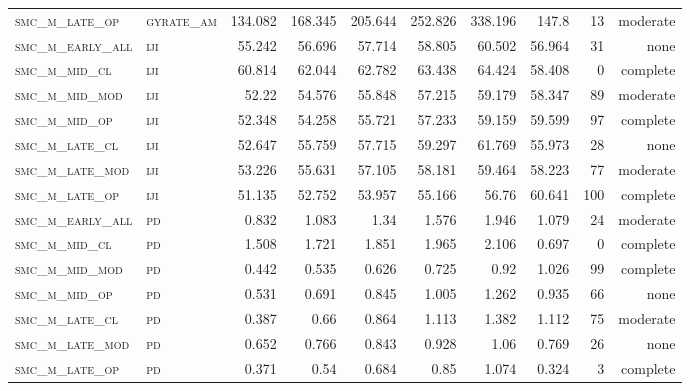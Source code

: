 \begin{landscape}
\begin{center}
\begin{footnotesize}
\begin{longtable}{llrrrrr|rrr}
\textsc{smc\_m\_late\_op  } & \textsc{gyrate\_am}   & 134.082  & 168.345  & 205.644  & 252.826  & 338.196  & 147.8    & 13  & moderate \\
\textsc{smc\_m\_early\_all} & \textsc{iji       }   & 55.242   & 56.696   & 57.714   & 58.805   & 60.502   & 56.964   & 31  & none     \\
\textsc{smc\_m\_mid\_cl   } & \textsc{iji       }   & 60.814   & 62.044   & 62.782   & 63.438   & 64.424   & 58.408   & 0   & complete \\
\textsc{smc\_m\_mid\_mod  } & \textsc{iji       }   & 52.22    & 54.576   & 55.848   & 57.215   & 59.179   & 58.347   & 89  & moderate \\
\textsc{smc\_m\_mid\_op   } & \textsc{iji       }   & 52.348   & 54.258   & 55.721   & 57.233   & 59.159   & 59.599   & 97  & complete \\
\textsc{smc\_m\_late\_cl  } & \textsc{iji       }   & 52.647   & 55.759   & 57.715   & 59.297   & 61.769   & 55.973   & 28  & none     \\
\textsc{smc\_m\_late\_mod } & \textsc{iji       }   & 53.226   & 55.631   & 57.105   & 58.181   & 59.464   & 58.223   & 77  & moderate \\
\textsc{smc\_m\_late\_op  } & \textsc{iji       }   & 51.135   & 52.752   & 53.957   & 55.166   & 56.76    & 60.641   & 100 & complete \\
\textsc{smc\_m\_early\_all} & \textsc{pd        }   & 0.832    & 1.083    & 1.34     & 1.576    & 1.946    & 1.079    & 24  & moderate \\
\textsc{smc\_m\_mid\_cl   } & \textsc{pd        }   & 1.508    & 1.721    & 1.851    & 1.965    & 2.106    & 0.697    & 0   & complete \\
\textsc{smc\_m\_mid\_mod  } & \textsc{pd        }   & 0.442    & 0.535    & 0.626    & 0.725    & 0.92     & 1.026    & 99  & complete \\
\textsc{smc\_m\_mid\_op   } & \textsc{pd        }   & 0.531    & 0.691    & 0.845    & 1.005    & 1.262    & 0.935    & 66  & none     \\
\textsc{smc\_m\_late\_cl  } & \textsc{pd        }   & 0.387    & 0.66     & 0.864    & 1.113    & 1.382    & 1.112    & 75  & moderate \\
\textsc{smc\_m\_late\_mod } & \textsc{pd        }   & 0.652    & 0.766    & 0.843    & 0.928    & 1.06     & 0.769    & 26  & none     \\
\textsc{smc\_m\_late\_op  } & \textsc{pd        }   & 0.371    & 0.54     & 0.684    & 0.85     & 1.074    & 0.324    & 3   & complete \\

\end{longtable}
\end{footnotesize}
\end{center}
\end{landscape}
